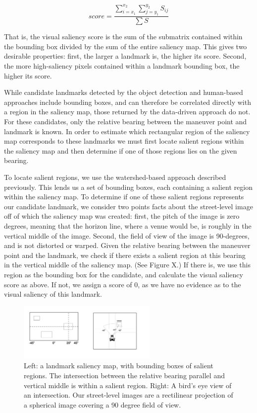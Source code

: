 \begin{equation}
    score= \frac{\sum\limits_{i=x_1}^{x_2} \sum\limits_{j=y_1}^{y_2} S_{ij}}{\sum S}
\end{equation}

That is, the visual saliency score is the sum of the submatrix contained within the bounding box divided by the sum of the entire saliency map. This gives two desirable properties: first, the larger a landmark is, the higher its score. Second, the more high-saliency pixels contained within a landmark bounding box, the higher its score.

While candidate landmarks detected by the object detection and human-based approaches include bounding boxes, and can therefore be correlated directly with a region in the saliency map, those returned by the data-driven approach do not. For these candidates, only the relative bearing between the maneuver point and landmark is known. In order to estimate which rectangular region of the saliency map corresponds to these landmarks we must first locate salient regions within the saliency map and then determine if one of those regions lies on the given bearing.

To locate salient regions, we use the watershed-based approach described previously. This lends us a set of bounding boxes, each containing a salient region within the saliency map. To determine if one of these salient regions represents our candidate landmark, we consider two points facts about the street-level image off of which the saliency map was created: first, the pitch of the image is zero degrees, meaning that the horizon line, where a venue would be, is roughly in the vertical middle of the image. Second, the field of view of the image is 90-degrees, and is not distorted or warped. Given the relative bearing between the maneuver point and the landmark, we check if there exists a salient region at this bearing in the vertical middle of the saliency map. (See Figure X.) If there is, we use this region as the bounding box for the candidate, and calculate the visual saliency score as above. If not, we assign a score of 0, as we have no evidence as to the visual saliency of this landmark.

\begin{figure}[htbp]
  \centering
  \includegraphics[width=0.6\textwidth]{images/landmark_search.pdf}
  \caption{Left: a landmark saliency map, with bounding boxes of salient regions. The intersection between the relative bearing parallel and vertical middle is within a salient region. Right: A bird's eye view of an intersection. Our street-level images are a rectilinear projection of a spherical image covering a 90 degree field of view.}
  \label{fig:pipeline:mm}
\end{figure}

